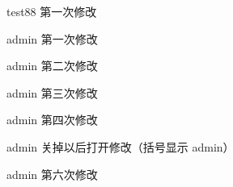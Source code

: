 
test88  第一次修改

admin 第一次修改

admin 第二次修改

admin 第三次修改

admin 第四次修改

admin 关掉以后打开修改（括号显示 admin）

admin 第六次修改
